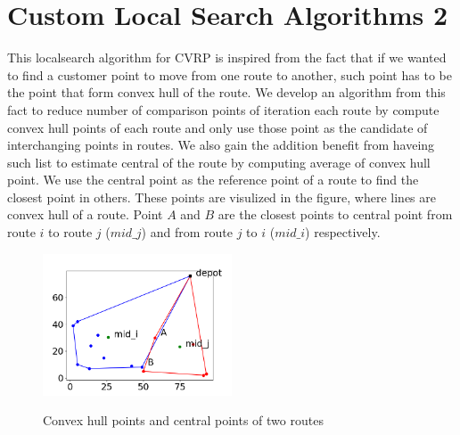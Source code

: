 \documentclass[12pt]{article}
\begin{document}
\section{Custom Local Search Algorithms 2}
This localsearch algorithm for CVRP is inspired from the fact that if we wanted to find a customer point to move from one route to another, such point has to be the point that form convex hull of the route. We develop an algorithm from this fact to reduce number of comparison points of iteration each route by compute convex hull points of each route and only use those point as the candidate of interchanging points in routes. We also gain the addition benefit from haveing such list to estimate central of the route by computing average of convex hull point. We use the central point as the reference point of a route to find the closest point in others. These points are visulized in the figure, where lines are convex hull of a route. Point \(A\) and \(B\) are the closest points to central point from route \(i\) to route \(j\) (\(mid\_j\)) and from route \(j\) to \(i\) (\(mid\_i\)) respectively.

\begin{figure}[H]
	\caption{Convex hull points and central points of two routes}
	\centering
	\includegraphics[width=0.5\textwidth]{convexmidclosest.png}
	\label{fig:localsearch1}

\end{figure}
\end{document}
